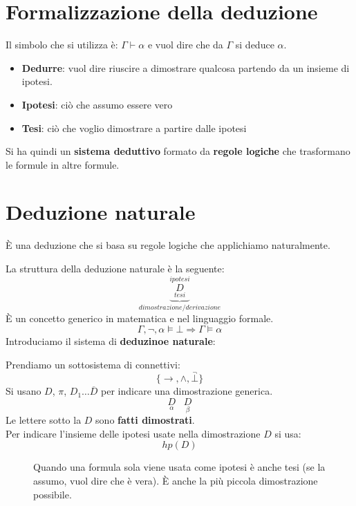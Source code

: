 \documentclass{article}
\theoremstyle{break}
\theoremstyle{break}
\theoremstyle{break}
\theoremstyle{break}
\begin{document}
\section{Formalizzazione della deduzione}
Il simbolo che si utilizza è: \( \Gamma \vdash \alpha\) e vuol dire che da
\( \Gamma \) si deduce \( \alpha \).

\begin{definition}
  \begin{itemize}
    \item \textbf{Dedurre}: vuol dire riuscire a dimostrare qualcosa partendo da un insieme di ipotesi.
    \item \textbf{Ipotesi}: ciò che assumo essere vero   
    \item \textbf{Tesi}: ciò che voglio dimostrare a partire dalle ipotesi
  \end{itemize}
\end{definition}
Si ha quindi un \textbf{sistema deduttivo} formato da \textbf{regole logiche} che
trasformano le formule in altre formule.

\section{Deduzione naturale}
È una deduzione che si basa su regole logiche che applichiamo naturalmente.

La struttura della deduzione naturale è la seguente:
\[
  \underbrace{\stackrel{ipotesi}{\underset{tesi}{D}}}_{dimostrazione/derivazione}
\] 
È un concetto generico in matematica e nel linguaggio formale.
\[
  \Gamma, \neg, \alpha \models \bot \Rightarrow \Gamma \models \alpha
\] 
Introduciamo il sistema di \textbf{deduzinoe naturale}:

Prendiamo un sottosistema di connettivi:
\[
  \{ \to, \wedge, \stackrel{\neg}{\bot}\} 
\] 
Si usano \( D \), \( \pi \), \( D_1 \ldots \overline{D} \) per indicare una dimostrazione
generica.
\[
  \underset{\alpha}{D}\;\;\; \underset{\beta}{D}
\] 
Le lettere sotto la \( D \) sono \textbf{fatti dimostrati}.\\
Per indicare l'insieme delle ipotesi usate nella dimostrazione \( D \) si usa: 
\[
  hp(D)
\] 
\begin{figure}[H]
  \begin{definition}
    Quando una formula sola viene usata come ipotesi è anche tesi (se la assumo, vuol dire che è vera).
    È anche la più piccola dimostrazione possibile.
  \end{definition}
\end{figure}
\end{document}
